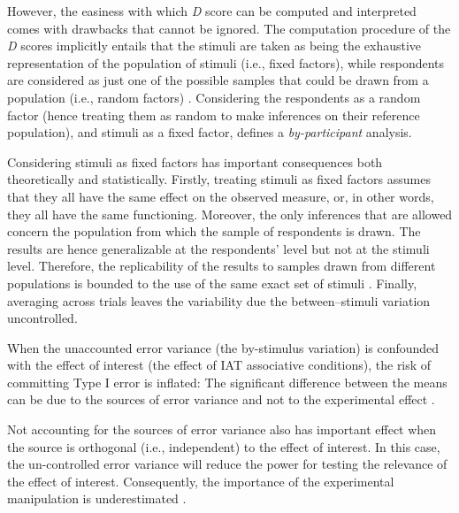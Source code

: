 \documentclass[12pt]{book}
\begin{document}
However, the easiness with which \emph{D} score can be computed and interpreted comes with drawbacks that cannot be ignored. 
The computation procedure of the \emph{D} scores implicitly entails that the stimuli are taken as being the exhaustive representation of the population of stimuli (i.e., fixed factors), while respondents are considered as just one of the possible samples that could be drawn from a population (i.e., random factors) \cite{judd2012}. Considering the respondents as a random factor (hence treating them as random to make inferences on their reference population), and stimuli as a fixed factor, defines a \emph{by-participant} analysis. 


Considering stimuli as fixed factors has important consequences both theoretically and statistically. 
 Firstly, treating stimuli as fixed factors assumes that they all have the same effect on the observed measure, or, in other words, they all have the same functioning. 
Moreover, the only inferences that are allowed concern the population from which the sample of respondents is drawn. The results are hence generalizable at the respondents' level but not at the stimuli level. 
Therefore, the replicability of the results to samples drawn from different populations is bounded to the use of the same exact set of stimuli \cite{judd2012}. 
Finally, averaging across trials leaves the variability due the between--stimuli variation uncontrolled.  

When the unaccounted error variance (the by-stimulus variation) is confounded with the effect of interest (the effect of IAT associative conditions), the risk of committing Type I error is inflated: The significant difference between the means can be due to the sources of error variance and not to the experimental effect \cite{Barr2013, judd2012,mc1989}. 

Not accounting for the sources of error variance also has important effect when the source is orthogonal (i.e., independent) to the effect of interest. In this case, the un-controlled error variance will reduce the power for testing the relevance of the effect of interest. Consequently, the importance of the experimental manipulation is underestimated \cite{Barr2013}. 
\end{document}
